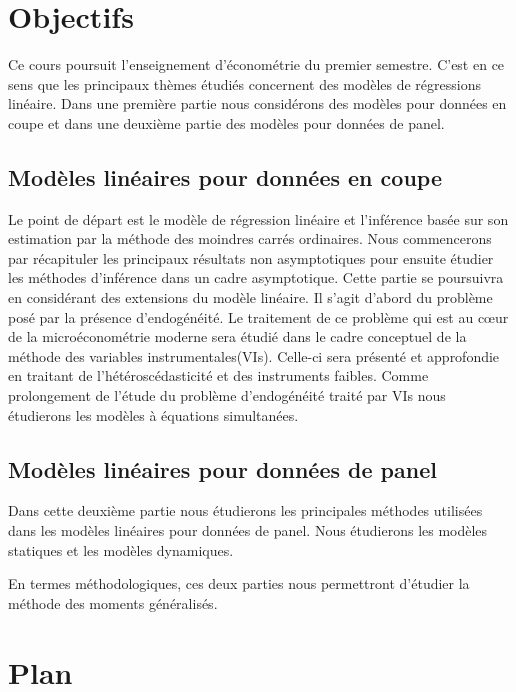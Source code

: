 \newpage

\tableofcontents

\newpage

\section{Objectifs}

 Ce cours poursuit l'enseignement d'économétrie du premier semestre. C'est en ce sens que les principaux 
 thèmes étudiés concernent des modèles de régressions linéaire. Dans une première partie nous considérons 
 des modèles pour données en coupe et dans une deuxième partie des modèles pour données de panel.

 \subsection{Modèles linéaires pour données en coupe}

 Le point de départ est le modèle de régression linéaire et l'inférence basée sur son estimation 
 par la méthode des moindres carrés ordinaires. Nous commencerons par récapituler 
 les principaux résultats non asymptotiques pour ensuite étudier 
 les méthodes d'inférence dans un cadre asymptotique. Cette partie se poursuivra en considérant des extensions 
du modèle linéaire. Il s'agit d'abord du problème posé par la présence d'endogénéité. 
Le traitement de ce problème qui est au cœur de la microéconométrie moderne sera étudié 
dans le cadre conceptuel de la méthode des variables instrumentales(VIs). 
Celle-ci sera présenté et approfondie en traitant de l'hétéroscédasticité  et des instruments faibles. 
Comme prolongement de l'étude du problème d'endogénéité traité par VIs nous étudierons les modèles à équations simultanées.


\subsection{Modèles linéaires pour données de panel}

Dans cette deuxième partie nous étudierons les principales méthodes utilisées dans les modèles linéaires 
pour données de panel. Nous étudierons les modèles statiques et les modèles dynamiques.

En termes méthodologiques, ces deux parties nous permettront d'étudier la méthode des moments généralisés.


\section{Plan}
 
